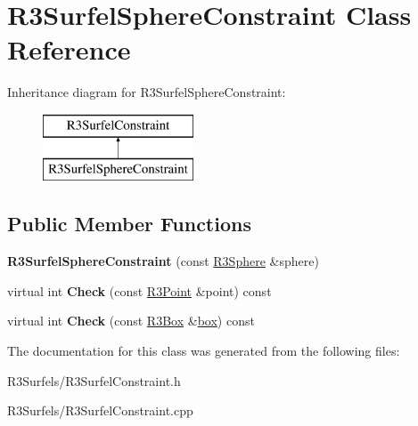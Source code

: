 \hypertarget{class_r3_surfel_sphere_constraint}{}\section{R3\+Surfel\+Sphere\+Constraint Class Reference}
\label{class_r3_surfel_sphere_constraint}
Inheritance diagram for R3\+Surfel\+Sphere\+Constraint\+:\begin{figure}[H]
\begin{center}
\leavevmode
\includegraphics[height=2.000000cm]{class_r3_surfel_sphere_constraint}
\end{center}
\end{figure}
\subsection*{Public Member Functions}
\begin{DoxyCompactItemize}
\item 
{\bfseries R3\+Surfel\+Sphere\+Constraint} (const \hyperlink{class_r3_sphere}{R3\+Sphere} \&sphere)\hypertarget{class_r3_surfel_sphere_constraint_a22c607400417a8c651472e96e6e9091f}{}\label{class_r3_surfel_sphere_constraint_a22c607400417a8c651472e96e6e9091f}

\item 
virtual int {\bfseries Check} (const \hyperlink{class_r3_point}{R3\+Point} \&point) const \hypertarget{class_r3_surfel_sphere_constraint_aef1956edae5f082422a4956b85323c75}{}\label{class_r3_surfel_sphere_constraint_aef1956edae5f082422a4956b85323c75}

\item 
virtual int {\bfseries Check} (const \hyperlink{class_r3_box}{R3\+Box} \&\hyperlink{structbox}{box}) const \hypertarget{class_r3_surfel_sphere_constraint_a5358fbd61492ca2251d3579002a144bf}{}\label{class_r3_surfel_sphere_constraint_a5358fbd61492ca2251d3579002a144bf}

\end{DoxyCompactItemize}


The documentation for this class was generated from the following files\+:\begin{DoxyCompactItemize}
\item 
R3\+Surfels/R3\+Surfel\+Constraint.\+h\item 
R3\+Surfels/R3\+Surfel\+Constraint.\+cpp\end{DoxyCompactItemize}
